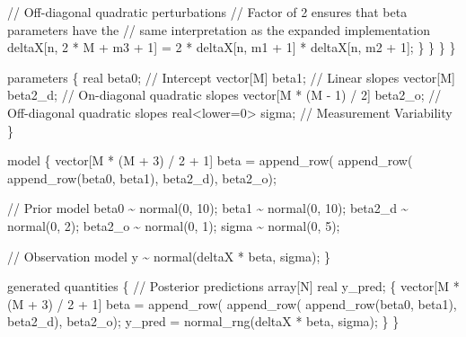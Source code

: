 \documentclass[
  letterpaper,
  DIV=11,
  numbers=noendperiod]{scrartcl}
\newenvironment{Shaded}{\begin{snugshade}}{\end{snugshade}}
\newcommand{\CommentTok}[1]{\textcolor[rgb]{0.37,0.37,0.37}{#1}}
\newcommand{\DataTypeTok}[1]{\textcolor[rgb]{0.68,0.00,0.00}{#1}}
\newcommand{\DecValTok}[1]{\textcolor[rgb]{0.68,0.00,0.00}{#1}}
\newcommand{\KeywordTok}[1]{\textcolor[rgb]{0.00,0.23,0.31}{#1}}
\newcommand{\NormalTok}[1]{\textcolor[rgb]{0.00,0.23,0.31}{#1}}
\begin{document}
\begin{codelisting}
\begin{Shaded}
\begin{Highlighting}[]
        \CommentTok{// Off{-}diagonal quadratic perturbations}
        \CommentTok{// Factor of 2 ensures that beta parameters have the}
        \CommentTok{// same interpretation as the expanded implementation}
\NormalTok{        deltaX[n, }\DecValTok{2}\NormalTok{ * M + m3 + }\DecValTok{1}\NormalTok{] }
\NormalTok{          = }\DecValTok{2}\NormalTok{ * deltaX[n, m1 + }\DecValTok{1}\NormalTok{] * deltaX[n, m2 + }\DecValTok{1}\NormalTok{];}
\NormalTok{      \}}
\NormalTok{    \}}
\NormalTok{  \}}
\NormalTok{\}}

\KeywordTok{parameters}\NormalTok{ \{}
  \DataTypeTok{real}\NormalTok{ beta0;                      }\CommentTok{// Intercept}
  \DataTypeTok{vector}\NormalTok{[M] beta1;                 }\CommentTok{// Linear slopes}
  \DataTypeTok{vector}\NormalTok{[M] beta2\_d;               }\CommentTok{// On{-}diagonal quadratic slopes}
  \DataTypeTok{vector}\NormalTok{[M * (M {-} }\DecValTok{1}\NormalTok{) / }\DecValTok{2}\NormalTok{] beta2\_o; }\CommentTok{// Off{-}diagonal quadratic slopes}
  \DataTypeTok{real}\NormalTok{\textless{}}\KeywordTok{lower}\NormalTok{=}\DecValTok{0}\NormalTok{\textgreater{} sigma;             }\CommentTok{// Measurement Variability}
\NormalTok{\}}

\KeywordTok{model}\NormalTok{ \{}
  \DataTypeTok{vector}\NormalTok{[M * (M + }\DecValTok{3}\NormalTok{) / }\DecValTok{2}\NormalTok{ + }\DecValTok{1}\NormalTok{] beta}
\NormalTok{    = append\_row(}
\NormalTok{        append\_row(}
\NormalTok{          append\_row(beta0, beta1), }
\NormalTok{        beta2\_d), }
\NormalTok{      beta2\_o);}
  
  \CommentTok{// Prior model}
\NormalTok{  beta0 \textasciitilde{} normal(}\DecValTok{0}\NormalTok{, }\DecValTok{10}\NormalTok{);}
\NormalTok{  beta1 \textasciitilde{} normal(}\DecValTok{0}\NormalTok{, }\DecValTok{10}\NormalTok{);}
\NormalTok{  beta2\_d \textasciitilde{} normal(}\DecValTok{0}\NormalTok{, }\DecValTok{2}\NormalTok{);}
\NormalTok{  beta2\_o \textasciitilde{} normal(}\DecValTok{0}\NormalTok{, }\DecValTok{1}\NormalTok{);}
\NormalTok{  sigma \textasciitilde{} normal(}\DecValTok{0}\NormalTok{, }\DecValTok{5}\NormalTok{);}

  \CommentTok{// Observation model}
\NormalTok{  y \textasciitilde{} normal(deltaX * beta, sigma);}
\NormalTok{\}}

\KeywordTok{generated quantities}\NormalTok{ \{}
  \CommentTok{// Posterior predictions}
  \DataTypeTok{array}\NormalTok{[N] }\DataTypeTok{real}\NormalTok{ y\_pred;}
\NormalTok{  \{}
    \DataTypeTok{vector}\NormalTok{[M * (M + }\DecValTok{3}\NormalTok{) / }\DecValTok{2}\NormalTok{ + }\DecValTok{1}\NormalTok{] beta}
\NormalTok{      = append\_row(}
\NormalTok{          append\_row(}
\NormalTok{            append\_row(beta0, beta1), }
\NormalTok{          beta2\_d),}
\NormalTok{        beta2\_o);}
\NormalTok{    y\_pred = normal\_rng(deltaX * beta, sigma);}
\NormalTok{  \}}
\NormalTok{\}}
\end{Highlighting}
\end{Shaded}

\end{codelisting}
\end{document}
